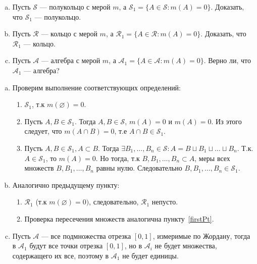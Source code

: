 \begin{task}{3}
\begin{enumerate}[(a)]
\item Пусть $\mathcal{S}$ --- полукольцо с мерой $m$, а $\mathcal{S}_1 = \{A \in \mathcal{S}: m(A) = 0\}$. Доказать, что  $\mathcal{S}_1$ --- полукольцо.
\item Пусть $\mathcal{R}$ --- кольцо с мерой $m$, а $\mathcal{R}_1 = \{A \in \mathcal{R}: m(A) = 0\}$. Доказать, что  $\mathcal{R}_1$ --- кольцо.
\item Пусть $\mathcal{A}$ --- алгебра с мерой $m$, а $\mathcal{A}_1 = \{A \in \mathcal{A}: m(A) = 0\}$. Верно ли, что  $\mathcal{A}_1$ --- алгебра?
\end{enumerate}
\end{task}
\begin{solution}
\begin{enumerate}[(a)]
\item\label{firstPt}
Проверим выполнение соответствующих определений:
\begin{enumerate}[1)]
    \item \varnothing \in $\mathcal{S}_1$, т.к $m(\varnothing) = 0$.
    \item Пусть $A, B \in \mathcal{S}_1$. Тогда $A, B \in \mathcal{S}$, $m(A) = 0$ и $m(A) = 0$.
    Из этого следует, что $m(A \cap B) = 0$, т.е $A \cap B \in \mathcal{S}_1$.
    \item Пусть $A, B \in \mathcal{S}_1, A \subset B$. Тогда $\exists B_1, \dots, B_n \in \mathcal{S}: A = B \sqcup B_1 \sqcup \dots \sqcup B_n$. Т.к. $A \in \mathcal{S}_1$, то $m (A) = 0$. Но тогда, т.к $B, B_1, \dots, B_n \subset A$, меры всех множеств $B, B_1, \dots, B_n$ равны нулю. Следовательно $B, B_1, \dots, B_n \in \mathcal{S}_1$.  
\end{enumerate}
\item Аналогично предыдущему пункту:
\begin{enumerate}[1)]
    \item \varnothing \in $\mathcal{R}_1$ (т.к $m(\varnothing) = 0)$, следовательно, $\mathcal{R}_1$ непусто.
    \item Проверка пересечения множеств аналогична пункту~\eqref{firstPt}.
\end{enumerate}
\item Пусть $\mathcal{A}$ — все подмножества отрезка $[0, 1]$, измеримые по Жордану, тогда в $\mathcal{A}_1$ будут все точки отрезка $[0, 1]$, но в $\mathcal{A}_i$ не будет множества, содержащего их все, поэтому в $\mathcal{A}_1$ не будет единицы.
\end{enumerate}
\end{solution}
